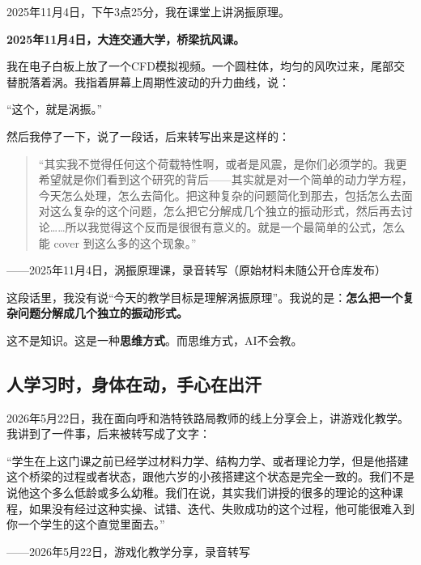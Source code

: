 2025年11月4日，下午3点25分，我在课堂上讲涡振原理。

\begin{classroom-scene}
\label{scene:chap1-vortex}

{
\noindent \textbf{2025年11月4日，大连交通大学，桥梁抗风课。}

\vspace{0.3cm}

\noindent 我在电子白板上放了一个CFD模拟视频。一个圆柱体，均匀的风吹过来，尾部交替脱落着涡。我指着屏幕上周期性波动的升力曲线，说：

\noindent “这个，就是涡振。”

\noindent 然后我停了一下，说了一段话，后来转写出来是这样的：

\vspace{0.3cm}

\begin{quote}
“其实我不觉得任何这个荷载特性啊，或者是风震，是你们必须学的。我更希望就是你们看到这个研究的背后——其实就是对一个简单的动力学方程，今天怎么处理，怎么去简化。把这种复杂的问题简化到那去，包括怎么去面对这么复杂的这个问题，怎么把它分解成几个独立的振动形式，然后再去讨论\ldots\ldots 所以我觉得这个反而是很很有意义的。就是一个最简单的公式，怎么能 cover 到这么多的这个现象。”
\end{quote}

\vspace{0.3cm}

\noindent ——2025年11月4日，涡振原理课，录音转写（原始材料未随公开仓库发布）
}
\end{classroom-scene}

这段话里，我没有说“今天的教学目标是理解涡振原理”。我说的是：\textbf{怎么把一个复杂问题分解成几个独立的振动形式。}

这不是知识。这是一种\textbf{思维方式}。而思维方式，AI不会教。

\subsection{人学习时，身体在动，手心在出汗}

2026年5月22日，我在面向呼和浩特铁路局教师的线上分享会上，讲游戏化教学。我讲到了一件事，后来被转写成了文字：

\begin{shiyu-inline}
“学生在上这门课之前已经学过材料力学、结构力学、或者理论力学，但是他搭建这个桥梁的过程或者状态，跟他六岁的小孩搭建这个状态是完全一致的。我们不是说他这个多么低龄或多么幼稚。我们在说，其实我们讲授的很多的理论的这种课程，如果没有经过这种实操、试错、迭代、失败成功的这个过程，他可能很难入到你一个学生的这个直觉里面去。”

\hfill ——2026年5月22日，游戏化教学分享，录音转写
\end{shiyu-inline}

